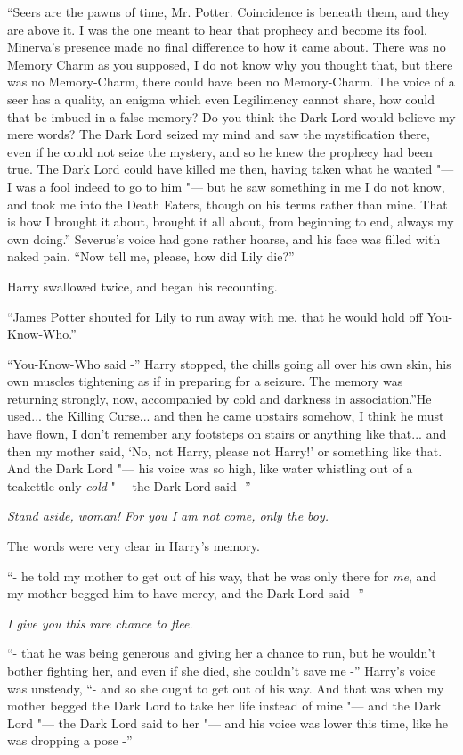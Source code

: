 ``Seers are the pawns of time, Mr. Potter. Coincidence is beneath them,
and they are above it. I was the one meant to hear that prophecy and
become its fool. Minerva's presence made no final difference to how it
came about. There was no Memory Charm as you supposed, I do not know why
you thought that, but there was no Memory-Charm, there could have been
no Memory-Charm. The voice of a seer has a quality, an enigma which even
Legilimency cannot share, how could that be imbued in a false memory? Do
you think the Dark Lord would believe my mere words? The Dark Lord
seized my mind and saw the mystification there, even if he could not
seize the mystery, and so he knew the prophecy had been true. The Dark
Lord could have killed me then, having taken what he wanted "--- I was a
fool indeed to go to him "--- but he saw something in me I do not know, and
took me into the Death Eaters, though on his terms rather than mine.
That is how I brought it about, brought it all about, from beginning to
end, always my own doing.'' Severus's voice had gone rather hoarse, and
his face was filled with naked pain. ``Now tell me, please, how did Lily
die?''

Harry swallowed twice, and began his recounting.

``James Potter shouted for Lily to run away with me, that he would hold
off You-Know-Who.''

``You-Know-Who said -'' Harry stopped, the chills going all over his own
skin, his own muscles tightening as if in preparing for a seizure. The
memory was returning strongly, now, accompanied by cold and darkness in
association.''He used... the Killing Curse... and then he came
upstairs somehow, I think he must have flown, I don't remember any
footsteps on stairs or anything like that... and then my mother
said, `No, not Harry, please not Harry!' or something like that. And the
Dark Lord "--- his voice was so high, like water whistling out of a
teakettle only \emph{cold} "--- the Dark Lord said -''

\emph{Stand aside, woman! For you I am not come, only the boy.}

The words were very clear in Harry's memory.

``- he told my mother to get out of his way, that he was only there for
\emph{me}, and my mother begged him to have mercy, and the Dark Lord
said -''

\emph{I give you this rare chance to flee.}

``- that he was being generous and giving her a chance to run, but he
wouldn't bother fighting her, and even if she died, she couldn't save me
-'' Harry's voice was unsteady, ``- and so she ought to get out of his
way. And that was when my mother begged the Dark Lord to take her life
instead of mine "--- and the Dark Lord "--- the Dark Lord said to her "--- and
his voice was lower this time, like he was dropping a pose -''

